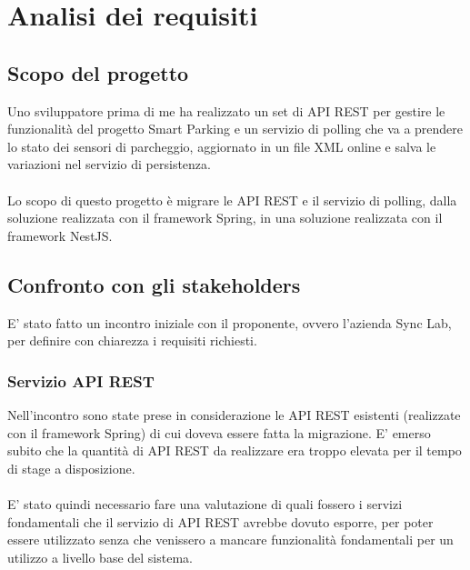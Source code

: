
\chapter{Analisi dei requisiti}
\label{cap:analisi-requisiti}

\section{Scopo del progetto}
Uno sviluppatore prima di me ha realizzato un set di \gls{API} \gls{REST} per gestire le funzionalità del progetto Smart Parking 
e un servizio di polling che va a prendere lo stato dei sensori di parcheggio, aggiornato 
in un file \gls{XML} online e salva le variazioni nel servizio di persistenza.
\\\\
Lo scopo di questo progetto è migrare le \gls{API} \gls{REST} e il servizio di polling, dalla soluzione
realizzata con il framework Spring, in una soluzione realizzata con il framework NestJS.

\section{Confronto con gli stakeholders}
E' stato fatto un incontro iniziale con il proponente, ovvero l'azienda Sync Lab,
per definire con chiarezza i requisiti richiesti.
\subsection{Servizio API REST}
Nell'incontro sono state prese in considerazione le \gls{API} \gls{REST} esistenti (realizzate con il framework Spring) 
di cui doveva essere fatta la migrazione.
E' emerso subito che la quantità di \gls{API} \gls{REST} da realizzare era troppo elevata per il
tempo di stage a disposizione. 
\\\\
E' stato quindi necessario fare una valutazione di quali fossero i servizi fondamentali che
il servizio di \gls{API} \gls{REST} avrebbe dovuto esporre, per poter essere utilizzato senza che venissero
a mancare funzionalità fondamentali per un utilizzo a livello base del sistema.

